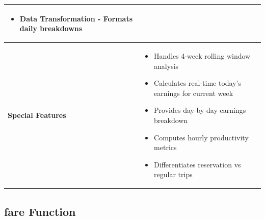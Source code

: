 \documentclass[11pt,a4paper]{article}
\begin{document}
\begin{longtable}{|p{4cm}|p{12cm}|}
\begin{itemize}[nosep]
\item Data Transformation - Formats daily breakdowns
\end{itemize} \\
\hline
\textbf{Special Features} & 
\begin{itemize}[nosep]
\item Handles 4-week rolling window analysis
\item Calculates real-time today's earnings for current week
\item Provides day-by-day earnings breakdown
\item Computes hourly productivity metrics
\item Differentiates reservation vs regular trips
\end{itemize} \\
\hline
\end{longtable}

\subsection{fare Function}
\end{document}
